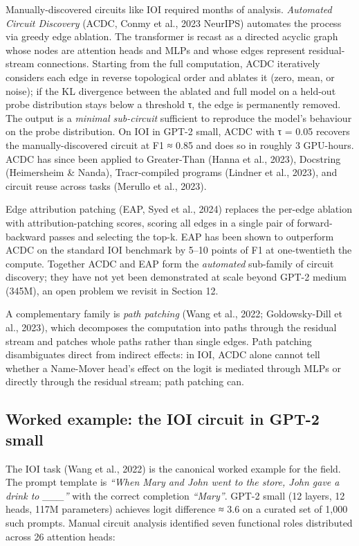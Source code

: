 Manually-discovered circuits like IOI required months of analysis. \emph{Automated Circuit Discovery} (ACDC, Conmy et al., 2023 NeurIPS) automates the process via greedy edge ablation. The transformer is recast as a directed acyclic graph whose nodes are attention heads and MLPs and whose edges represent residual-stream connections. Starting from the full computation, ACDC iteratively considers each edge in reverse topological order and ablates it (zero, mean, or noise); if the KL divergence between the ablated and full model on a held-out probe distribution stays below a threshold τ, the edge is permanently removed. The output is a \emph{minimal sub-circuit} sufficient to reproduce the model's behaviour on the probe distribution. On IOI in GPT-2 small, ACDC with τ = 0.05 recovers the manually-discovered circuit at F1 ≈ 0.85 and does so in roughly 3 GPU-hours. ACDC has since been applied to Greater-Than (Hanna et al., 2023), Docstring (Heimersheim \& Nanda), Tracr-compiled programs (Lindner et al., 2023), and circuit reuse across tasks (Merullo et al., 2023).

Edge attribution patching (EAP, Syed et al., 2024) replaces the per-edge ablation with attribution-patching scores, scoring all edges in a single pair of forward-backward passes and selecting the top-k. EAP has been shown to outperform ACDC on the standard IOI benchmark by 5--10 points of F1 at one-twentieth the compute. Together ACDC and EAP form the \emph{automated} sub-family of circuit discovery; they have not yet been demonstrated at scale beyond GPT-2 medium (345M), an open problem we revisit in Section 12.

A complementary family is \emph{path patching} (Wang et al., 2022; Goldowsky-Dill et al., 2023), which decomposes the computation into paths through the residual stream and patches whole paths rather than single edges. Path patching disambiguates direct from indirect effects: in IOI, ACDC alone cannot tell whether a Name-Mover head's effect on the logit is mediated through MLPs or directly through the residual stream; path patching can.

\subsection{Worked example: the IOI circuit in GPT-2 small}\label{worked-example-the-ioi-circuit-in-gpt-2-small}

The IOI task (Wang et al., 2022) is the canonical worked example for the field. The prompt template is \emph{``When Mary and John went to the store, John gave a drink to \_\_\_''} with the correct completion \emph{``Mary''}. GPT-2 small (12 layers, 12 heads, 117M parameters) achieves logit difference ≈ 3.6 on a curated set of 1,000 such prompts. Manual circuit analysis identified seven functional roles distributed across 26 attention heads:

